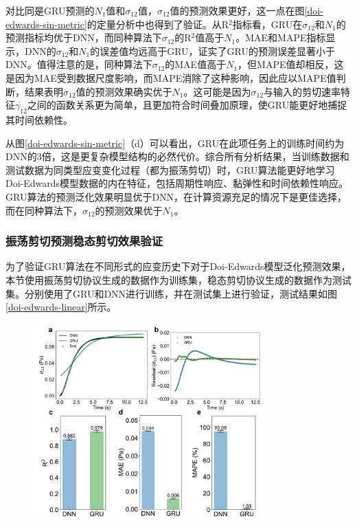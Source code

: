对比同是GRU预测的$N_1$值和$\sigma_{12}$值，$\sigma_{12}$值的预测效果更好，这一点在图\ref{doi-edwards-sin-metric}的定量分析中也得到了验证。从R$^2$指标看，GRU在$\sigma_{12}$和$N_1$的预测指标均优于DNN，而同种算法下$\sigma_{12}$的R$^2$值高于$N_1$。MAE和MAPE指标显示，DNN的$\sigma_{12}$和$N_1$的误差值均远高于GRU，证实了GRU的预测误差显著小于DNN。值得注意的是，同种算法下$\sigma_{12}$的MAE值高于$N_1$，但MAPE值却相反，这是因为MAE受到数据尺度影响，而MAPE消除了这种影响，因此应以MAPE值判断，结果表明$\sigma_{12}$值的预测效果确实优于$N_1$。这可能是因为$\sigma_{12}$与输入的剪切速率特征$\dot{\gamma_{12}}$之间的函数关系更为简单，且更加符合时间叠加原理，使GRU能更好地捕捉其时间依赖性。

从图\ref{doi-edwards-sin-metric}（d）可以看出，GRU在此项任务上的训练时间约为DNN的3倍，这是更复杂模型结构的必然代价。综合所有分析结果，当训练数据和测试数据为同类型应变变化过程（都为振荡剪切）时，GRU算法能更好地学习Doi-Edwards模型数据的内在特征，包括周期性响应、黏弹性和时间依赖性响应。GRU算法的预测泛化效果明显优于DNN，在计算资源充足的情况下是更佳选择，而在同种算法下，$\sigma_{12}$的预测效果优于$N_1$。

\subsubsection{振荡剪切预测稳态剪切效果验证}
为了验证GRU算法在不同形式的应变历史下对于Doi-Edwards模型泛化预测效果，本节使用振荡剪切协议生成的数据作为训练集，稳态剪切协议生成的数据作为测试集。分别使用了GRU和DNN进行训练，并在测试集上进行验证，测试结果如图\ref{doi-edwards-linear}所示。
\begin{figure}[htbp]
  \centering
  \includegraphics[width=0.8\textwidth]{Fig/doi-edwards-linear.pdf}
\end{figure}

